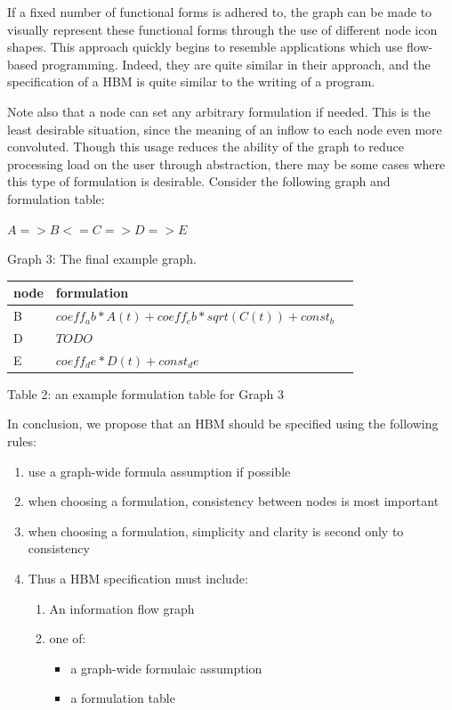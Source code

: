 \documentclass[conference]{IEEEtran}
\begin{document}
If a fixed number of functional forms is adhered to, the graph can be made to visually represent these functional forms through the use of different node icon shapes. 
This approach quickly begins to resemble applications which use flow-based programming. 
Indeed, they are quite similar in their approach, and the specification of a HBM is quite similar to the writing of a program.

Note also that a node can set any arbitrary formulation if needed. 
This is the least desirable situation, since the meaning of an inflow to each node even more convoluted. 
Though this usage reduces the ability of the graph to reduce processing load on the user through abstraction, there may be some cases where this type of formulation is desirable. 
Consider the following graph and formulation table:

$A => B <= C => D => E$

Graph 3: The final example graph.

\begin{centering}
\begin{tabular}{ | l | l | l |}
    \hline
    node & formulation \\ \hline
    B & $coeff_ab*A(t) + coeff_cb*sqrt(C(t)) + const_b$ \\ \hline
    D & $ TODO $ \\ \hline
    E & $coeff_de*D(t) + const_de$ \\ \hline
\end{tabular}
Table 2: an example formulation table for Graph 3
\end{centering}

In conclusion, we propose that an HBM should be specified using the following rules:

\begin{enumerate}
  \item use a graph-wide formula assumption if possible
  \item when choosing a formulation, consistency between nodes is most important
  \item when choosing a formulation, simplicity and clarity is second only to consistency
  \item Thus a HBM specification must include:
  \begin{enumerate}
   \item An information flow graph
   \item one of:
    \begin{itemize}
      \item a graph-wide formulaic assumption
      \item a formulation table 
    \end{itemize}
  \end{enumerate}
\end{enumerate}
\end{document}
